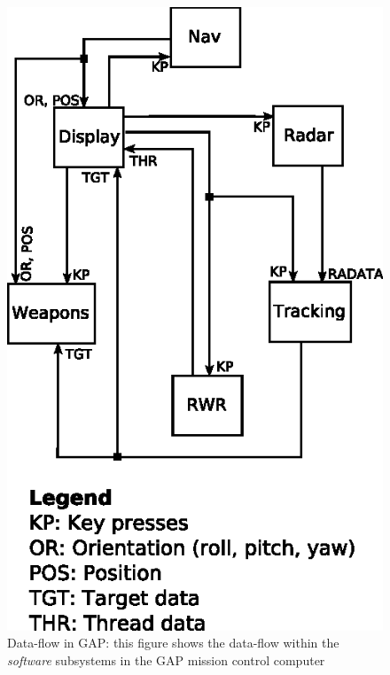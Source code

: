 \begin{figure}
\centering
\includegraphics{figs/dataflow}
\caption{Data-flow in GAP: {\normalsize this figure shows the
    data-flow within the \emph{software} subsystems in the GAP mission
    control computer}}
\label{fig:dataflow}
\end{figure}

